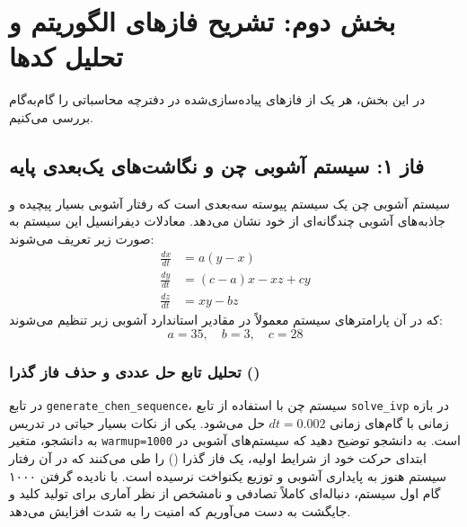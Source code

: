\chapter{بخش دوم: تشریح فازهای الگوریتم و تحلیل کدها}

در این بخش، هر یک از فازهای پیاده‌سازی‌شده در دفترچه محاسباتی را گام‌به‌گام بررسی می‌کنیم.

\section{فاز ۱: سیستم آشوبی چن و نگاشت‌های یک‌بعدی پایه}
سیستم آشوبی چن یک سیستم پیوسته سه‌بعدی است که رفتار آشوبی بسیار پیچیده و جاذبه‌های آشوبی چندگانه‌ای از خود نشان می‌دهد. معادلات دیفرانسیل این سیستم به صورت زیر تعریف می‌شوند:
\begin{equation}
\label{eq:chen}
\begin{aligned}
\frac{dx}{dt} &= a(y - x) \\
\frac{dy}{dt} &= (c - a)x - xz + cy \\
\frac{dz}{dt} &= xy - bz
\end{aligned}
\end{equation}
که در آن پارامترهای سیستم معمولاً در مقادیر استاندارد آشوبی زیر تنظیم می‌شوند:
\begin{equation}
a = 35, \quad b = 3, \quad c = 28
\end{equation}

\subsection{تحلیل تابع حل عددی و حذف فاز گذرا ()}
در تابع \texttt{generate\_chen\_sequence}، سیستم چن با استفاده از تابع \texttt{solve\_ivp} در بازه زمانی با گام‌های زمانی $dt = 0.002$ حل می‌شود. یکی از نکات بسیار حیاتی در تدریس به دانشجو، متغیر \texttt{warmup=1000} است. 
به دانشجو توضیح دهید که سیستم‌های آشوبی در ابتدای حرکت خود از شرایط اولیه، یک فاز گذرا () را طی می‌کنند که در آن رفتار سیستم هنوز به پایداری آشوبی و توزیع یکنواخت نرسیده است. با نادیده گرفتن ۱۰۰۰ گام اول سیستم، دنباله‌ای کاملاً تصادفی و نامشخص از نظر آماری برای تولید کلید و جایگشت به دست می‌آوریم که امنیت را به شدت افزایش می‌دهد.


